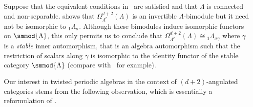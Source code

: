 \documentclass[a4paper]{amsart}
\begin{document}
\begin{remark}
  Suppose that the equivalent conditions in~
  are satisfied and that $\Lambda$ is connected and non-separable.
   shows that $\Omega_{\Lambda^e}^{d+2}(\Lambda)$ is an invertible
  $\Lambda$-bimodule but it need not be isomorphic to ${}_1\Lambda_{\sigma}$.
  Although these bimodules induce isomorphic functors on $\smmod{\Lambda}$, this
  only permits us to conclude that
  $\Omega_{\Lambda^e}^{d+2}(\Lambda)\cong{}_1\Lambda_{\sigma\gamma}$ where $\gamma$
  is a \emph{stable} inner automorphism, that is an algebra automorphism such that
  the restriction of scalars along $\gamma$ is isomorphic to the identity
  functor of the stable category $\smmod{\Lambda}$ (compare
  with~\cite[Thm.~1.8]{IV14} for example).
\end{remark}

Our interest in twisted periodic algebras in the context of $(d+2)$-angulated
categories stems from the following observation, which is essentially a
reformulation of .
\end{document}
